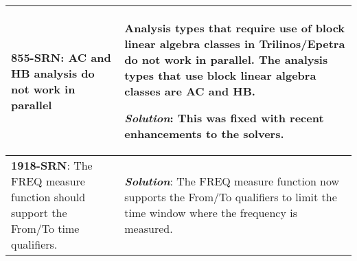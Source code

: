 \begin{longtable}[h] {>{\raggedright\small}m{2in}|>{\raggedright\let\\\tabularnewline\small}m{3.5in}}
\textbf{855-SRN}: AC and HB analysis do not work in parallel & Analysis types that
require use of block linear algebra classes in Trilinos/Epetra do not work in
parallel.  The analysis types that use block linear algebra classes are AC and
HB.

\textbf{\textit{Solution}}: This was fixed with recent enhancements to the
solvers.
\\ \hline

\textbf{1918-SRN}: The FREQ measure function should support the From/To time qualifiers. & 

\textbf{\textit{Solution}}: The FREQ measure function now supports the From/To qualifiers to
limit the time window where the frequency is measured.
\\ \hline


\end{longtable}


